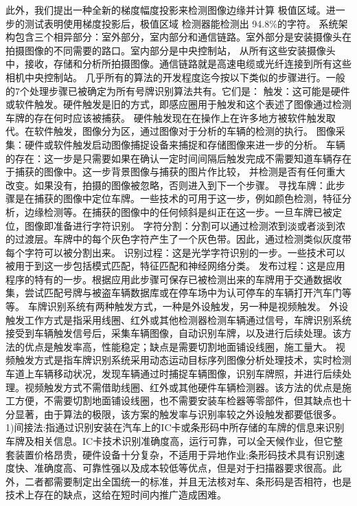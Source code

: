 \documentclass[UTF8]{article}
\begin{document}
此外，我们提出一种全新的梯度幅度投影来检测图像边缘并计算 极值区域。进一步的测试表明使用梯度投影后，极值区域 检测器能检测出 94.8\%的字符。
系统架构包含三个相异部分：室外部分，室内部分和通信链路。室外部分是安装摄像头在拍摄图像的不同需要的路口。室内部分是中央控制站，
从所有这些安装摄像头中，接收，存储和分析所拍摄图像。通信链路就是高速电缆或光纤连接到所有这些相机中央控制站。
几乎所有的算法的开发程度迄今按以下类似的步骤进行。一般的7个处理步骤已被确定为所有号牌识别算法共有。它们是：
触发：这可能是硬件或软件触发。硬件触发是旧的方式，即感应圈用于触发和这个表述了图像通过检测车牌的存在何时应该被捕获。
硬件触发现在在操作上在许多地方被软件触发取代。在软件触发，图像分为区，通过图像对于分析的车辆的检测的执行。
图像采集：硬件或软件触发启动图像捕捉设备来捕捉和存储图像来进一步的分析。
车辆的存在：这一步是只需要如果在确认一定时间间隔后触发完成不需要知道车辆存在于捕获的图像中。这一步背景图像与捕获的图片作比较，
并检测是否有任何重大改变。如果没有，拍摄的图像被忽略，否则进入到下一个步骤。
寻找车牌：此步骤是在捕获的图像中定位车牌。一些技术的可用于这一步，例如颜色检测，特征分析，边缘检测等。在捕获的图像中的任何倾斜是纠正在这一步。一旦车牌已被定位，图像即准备进行字符识别。
字符分割：分割可以通过检测浓到淡或者淡到浓的过渡层。车牌中的每个灰色字符产生了一个灰色带。因此，通过检测类似灰度带每个字符可以被分割出来。
识别过程：这是光学字符识别的一步。一些技术可以被用于到这一步包括模式匹配，特征匹配和神经网络分类。
发布过程：这是应用程序的特有的一步。根据应用此步骤可保存已被检测出来的车牌用于交通数据收集，尝试匹配号牌与被盗车辆数据库或在停车场中为认可停车的车辆打开汽车门等等。
车牌识别系统有两种触发方式，一种是外设触发，另一种是视频触发。
外设触发工作方式是指采用线圈、红外或其他检测器检测车辆通过信号，车牌识别系统接受到车辆触发信号后，采集车辆图像，自动识别车牌，以及进行后续处理。该方法的优点是触发率高，性能稳定；缺点是需要切割地面铺设线圈，施工量大。
视频触发方式是指车牌识别系统采用动态运动目标序列图像分析处理技术，实时检测车道上车辆移动状况，发现车辆通过时捕捉车辆图像，识别车牌照，并进行后续处理。视频触发方式不需借助线圈、红外或其他硬件车辆检测器。该方法的优点是施工方便，不需要切割地面铺设线圈，也不需要安装车检器等零部件，但其缺点也十分显著，由于算法的极限，该方案的触发率与识别率较之外设触发都要低很多。
1)间接法:指通过识别安装在汽车上的IC卡或条形码中所存储的车牌的信息来识别车牌及相关信息。IC卡技术识别准确度高，运行可靠，可以全天候作业，但它整套装置价格昂贵，硬件设备十分复杂，不适用于异地作业;条形码技术具有识别速度快、准确度高、可靠性强以及成本较低等优点，但是对于扫描器要求很高。此外，二者都需要制定出全国统一的标准，并且无法核对车、条形码是否相符，也是技术上存在的缺点，这给在短时间内推广造成困难。
\end{document}
